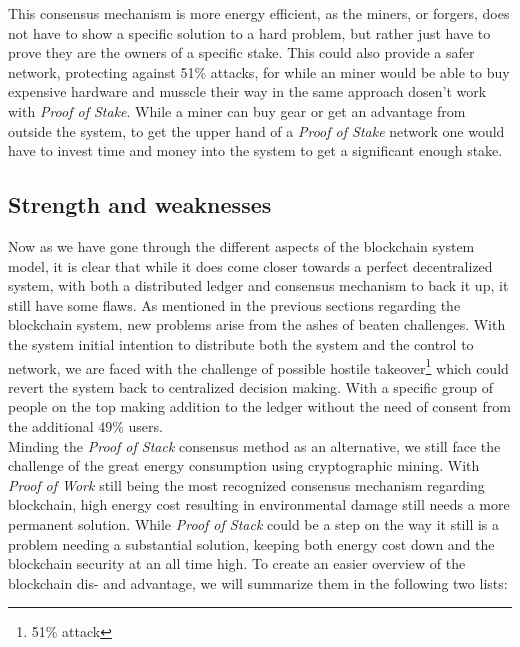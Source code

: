 \documentclass[paper=a4, fontsize=11pt]{scrartcl} %
\numberwithin{equation}{section} %
\numberwithin{figure}{section} %
\numberwithin{table}{section} %
\begin{document}
This consensus mechanism is more energy efficient, as the miners, or forgers, does not have to show a specific solution to a hard problem, but rather just have to prove they are the owners of a specific stake. This could also provide a safer network, protecting against 51\% attacks, for while an miner would be able to buy expensive hardware and musscle their way in the same approach dosen't work with \textit{Proof of Stake}. While a miner can buy gear or get an advantage from outside the system, to get the upper hand of a \textit{Proof of Stake} network one would have to invest time and money into the system to get a significant enough stake. 

\subsection{Strength and weaknesses}

Now as we have gone through the different aspects of the blockchain system model, it is clear that while it does come closer towards a perfect decentralized system, with both a distributed ledger and consensus mechanism to back it up, it still have some flaws. As mentioned in the previous sections regarding the blockchain system, new problems arise from the ashes of beaten challenges. With the system initial intention to distribute both the system and the control to network, we are faced with the challenge of possible hostile takeover\footnote{51\% attack\cite{51}} which could revert the system back to centralized decision making. With a specific group of people on the top making addition to the ledger without the need of consent from the additional 49\% users.\\

Minding the \textit{Proof of Stack} consensus method as an alternative, we still face the challenge of the great energy consumption using cryptographic mining. With \textit{Proof of Work} still being the most recognized consensus mechanism regarding blockchain, high energy cost resulting in environmental damage still needs a more permanent solution. While \textit{Proof of Stack} could be a step on the way it still is a problem needing a substantial solution, keeping both energy cost down and the blockchain security at an all time high. To create an easier overview of the blockchain dis- and advantage, we will summarize them in the following two lists:\\
\end{document}
